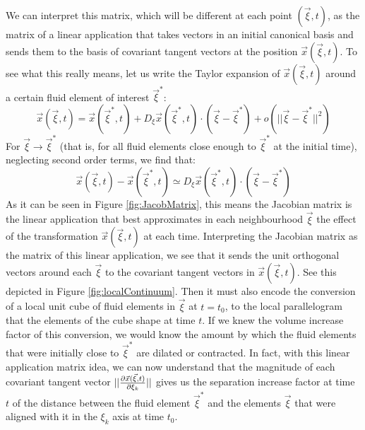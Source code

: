 \documentclass[11pt, a4paper]{article} %
\begin{document}
We can interpret this matrix, which will be different at each point $(\vec{\xi},t)$, as the matrix of a linear application that takes vectors in an initial canonical basis and sends them to the basis of covariant tangent vectors at the position $\vec{x}(\vec{\xi},t)$. To see what this really means, let us write the Taylor expansion of $\vec{x}(\vec{\xi},t)$ around a certain fluid element of interest $\vec{\xi}^*$:
\begin{equation}
\vec{x}(\vec{\xi},t)=\vec{x}(\vec{\xi}^*,t)+D_{\xi}\vec{x}(\vec{\xi}^*,t)\cdot (\vec{\xi}-\vec{\xi}^*)+o(||\vec{\xi}-\vec{\xi}^*||^2)
\end{equation}
For $\vec{\xi}\rightarrow \vec{\xi}^*$ (that is, for all fluid elements close enough to $\vec{\xi}^*$ at the initial time), neglecting second order terms, we find that:
\begin{equation}
\vec{x}(\vec{\xi},t)-\vec{x}(\vec{\xi}^*,t)\simeq D_{\xi}\vec{x}(\vec{\xi}^*,t)\cdot (\vec{\xi}-\vec{\xi}^*)
\end{equation}
As it can be seen in Figure \ref{fig:JacobMatrix}, this means the Jacobian matrix is the linear application that best approximates in each neighbourhood $\vec{\xi}$ the effect of the transformation $\vec{x}(\vec{\xi},t)$ at each time. Interpreting the Jacobian matrix as the matrix of this linear application, we see that it sends the unit orthogonal vectors around each $\vec{\xi}$ to the covariant tangent vectors in $\vec{x}(\vec{\xi},t)$. See this depicted in Figure \ref{fig:localContinuum}. Then it must also encode the conversion of a local unit cube of fluid elements in $\vec{\xi}$ at $t=t_0$, to the local parallelogram that the elements of the cube shape at time $t$. If we knew the volume increase factor of this conversion, we would know the amount by which the fluid elements that were initially close to $\vec{\xi}^*$ are dilated or contracted. In fact, with this linear application matrix idea, we can now understand that the magnitude of each covariant tangent vector $||\pdv{\vec{x}(\vec{\xi},t)}{\xi_k}||$ gives us the separation increase factor at time $t$ of the distance between the fluid element $\vec{\xi}^*$ and the elements $\vec{\xi}$ that were aligned with it in the $\xi_k$ axis at time $t_0$.
\end{document}
